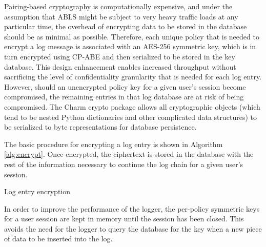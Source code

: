 \documentclass{sig-alternate}
\begin{document}
Pairing-based cryptography is computationally expensive, and under the assumption that ABLS might be subject 
to very heavy traffic loads at any particular time, the 
overhead of encrypting data to be stored in the database should be as minimal as possible. Therefore, each unique
policy that is needed to encrypt a log message is associated with an AES-256 symmetric key, which is in 
turn encrypted using CP-ABE and then serialized to be stored in the key database. This design enhancement enables 
increased throughput without sacrificing the level of confidentiality granularity that is needed for each log entry. 
However, should an unencrypted policy key for a given user's session become compromised, the remaining entries in 
that log database are at risk of being compromised. The Charm crypto package allows all cryptographic 
objects (which tend to be nested Python dictionaries and other complicated data structures) to be serialized to byte 
representations for database persistence. 

The basic procedure for encrypting a log entry is shown in Algorithm \ref{alg:encrypt}. Once encrypted, the ciphertext
is stored in the database with the rest of the information necessary to continue the log chain for a given user's session.
  
\begin{algorithm}[ht!] %
\caption{Log entry encryption} \label{alg:encrypt}
\begin{algorithmic}[1]

\ELSE
\ENDIF
{}
\end{algorithmic}
\end{algorithm}

In order to improve the performance of the logger, the per-policy symmetric keys for a user session are kept
in memory until the session has been closed. This avoids the need for the logger to query the database for the key 
when a new piece of data to be inserted into the log. 
\end{document}
